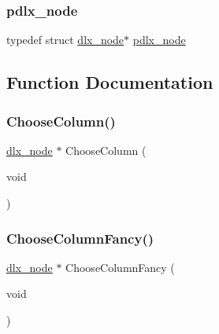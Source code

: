 \subsubsection{\texorpdfstring{pdlx\+\_\+node}{pdlx\_node}}
{\footnotesize\ttfamily typedef struct \mbox{\hyperlink{structdlx__node}{dlx\+\_\+node}}$\ast$ \mbox{\hyperlink{_l_i_b_2_g_a_l_o_i_s_2dlx_8_c_a09898f11bc2b90a1c99edf2ebd49756b}{pdlx\+\_\+node}}}



\subsection{Function Documentation}
\mbox{\label{_l_i_b_2_g_a_l_o_i_s_2dlx_8_c_ab9cb65741895b0cca305fac563917215}} 
\subsubsection{\texorpdfstring{Choose\+Column()}{ChooseColumn()}}
{\footnotesize\ttfamily \mbox{\hyperlink{structdlx__node}{dlx\+\_\+node}} $\ast$ Choose\+Column (\begin{DoxyParamCaption}\item[{void}]{ }\end{DoxyParamCaption})}

\mbox{\label{_l_i_b_2_g_a_l_o_i_s_2dlx_8_c_a9e4dbecc7e3b59f9ff63364f043a936b}} 
\subsubsection{\texorpdfstring{Choose\+Column\+Fancy()}{ChooseColumnFancy()}}
{\footnotesize\ttfamily \mbox{\hyperlink{structdlx__node}{dlx\+\_\+node}} $\ast$ Choose\+Column\+Fancy (\begin{DoxyParamCaption}\item[{void}]{ }\end{DoxyParamCaption})}

